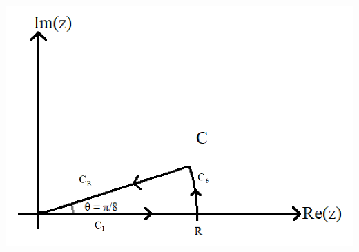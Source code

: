 \documentclass{article}
\begin{document}
\begin{itemize}
\begin{itemize}
        \begin{center}
            \includegraphics[scale = 0.3]{sector_contour.PNG}
        \end{center}


\end{itemize}
\end{itemize}
\end{document}
